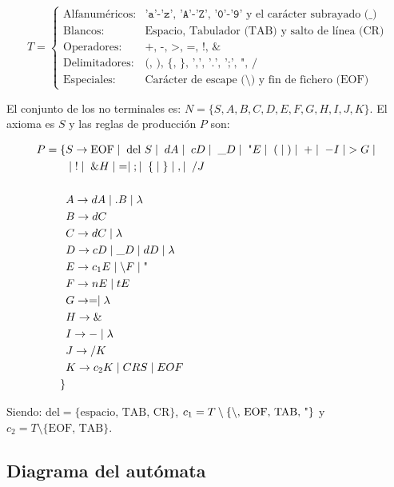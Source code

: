 \documentclass{article}
\begin{document}
{\small
\[
T = \left\{ 
\begin{array}{ll}
\text{Alfanuméricos:} & \texttt{'a'-'z', 'A'-'Z', '0'-'9'} \text{ y el carácter subrayado (\_)} \\
\text{Blancos:} & \text{Espacio, Tabulador (TAB) y salto de línea (CR)} \\
\text{Operadores:} & \texttt{+, -, >, =, !, \&} \\
\text{Delimitadores:} & \texttt{(, ), \{, \}, ',', '.', ';', ", /} \\
\text{Especiales:} & \text{Carácter de escape (\textbackslash) y fin de fichero (EOF)}
\end{array} 
\right.
\]
}

El conjunto de los no terminales es: $N = \{S, A, B, C, D, E, F, G, H, I, J, K\}$. El axioma es $S$ y las reglas de producción $P$ son:

\[ 
\begin{aligned}
P = \{ & S \to \text{EOF} \mid \; \text{del } S \mid \; d A \mid \; c D \mid \; \_ D \mid \; \text{\textquotedbl} E \mid \; ( \; \mid \; ) \mid \; + \mid \; - I \mid \; > G \mid \; \\
       & \mid \; ! \mid \; \& H \mid \; = \mid \; ; \mid \; \{ \; \mid \; \} \mid \; , \mid \; / J\\ \\
       & A \to d A \mid . B \mid \lambda \\
       & B \to d C \\
       & C \to d C \mid \lambda \\
       & D \to c D \mid \_ D \mid d D \mid \lambda \\
       & E \to c_1 E \mid \text{\textbackslash} F \mid \text{\textquotedbl} \\
       & F \to n E \mid t E \\
       & G \to = \mid \lambda \\
       & H \to \& \\
       & I \to - \mid \lambda \\
       & J \to / K \\
       & K \to c_2 K \mid CR S \mid EOF \\
\}
\end{aligned}
\]

Siendo: $\text{del} = \{\text{espacio, TAB, CR}\}$, $c_1 = T \setminus \{\text{\textbackslash, EOF, TAB, \textquotedbl}\}$ y $c_2 = T \setminus \{\text{EOF, TAB}\}$.

\subsection{Diagrama del autómata}
\end{document}
